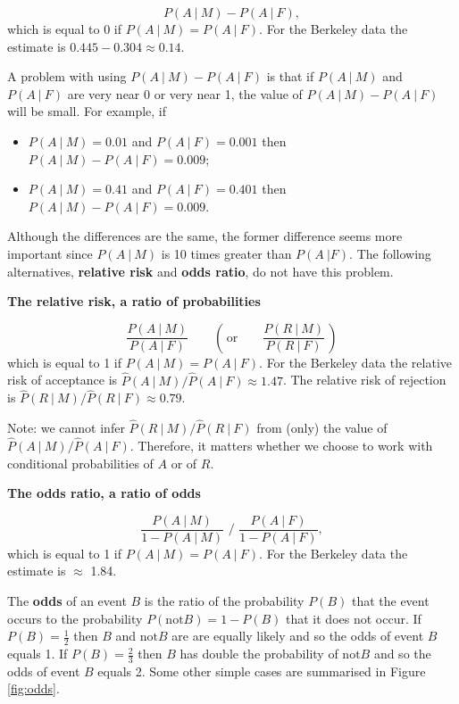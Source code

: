 \documentclass[
  british,
  11pt,
  openany, a4paper]{book}
\providecommand{\tightlist}{%
  \setlength{\itemsep}{0pt}\setlength{\parskip}{0pt}}
\begin{document}
\[P(A~|~M)-P(A~|~F),\]
which is equal to 0 if \(P(A~|~M)=P(A~|~F)\). For the Berkeley data the estimate is \(0.445 - 0.304 \approx 0.14\).

A problem with using \(P(A~|~M)-P(A~|~F)\) is that if \(P(A~|~M)\) and \(P(A~|~F)\) are very near 0 or very near 1, the value of \(P(A~|~M)-P(A~|~F)\) will be small. For example, if

\begin{itemize}
\tightlist
\item
  \(P(A~|~M)=0.01\) and \(P(A~|~F)=0.001\) then \(P(A~|~M)-P(A~|~F)=0.009\);
\item
  \(P(A~|~M)=0.41\) and \(P(A~|~F)=0.401\) then \(P(A~|~M)-P(A~|~F)=0.009\).
\end{itemize}

Although the differences are the same, the former difference seems more important since \(P(A~|~M)\) is 10 times greater than \(P(A~|F)\). The following alternatives, \textbf{relative risk} and \textbf{odds ratio}, do not have this problem.

\textbf{The relative risk, a ratio of probabilities}

\[\frac{P(A~|~M)}{P(A~|~F)} \qquad \left( \,\text{or} \qquad \frac{P(R~|~M)}{P(R~|~F)} \,\right)\]
which is equal to 1 if \(P(A~|~M)=P(A~|~F)\). For the Berkeley data the relative risk of acceptance is \(\hat{P}(A~|~M)/\hat{P}(A~|~F) \approx 1.47\). The relative risk of rejection is \(\hat{P}(R~|~M)/\hat{P}(R~|~F) \approx 0.79\).

Note: we cannot infer \(\hat{P}(R~|~M)/\hat{P}(R~|~F)\) from (only) the value of \(\hat{P}(A~|~M)/\hat{P}(A~|~F)\). Therefore, it matters whether we choose to work with conditional probabilities of \(A\) or of \(R\).

\textbf{The odds ratio, a ratio of odds}

\[\frac{P(A~|~M)}{1-P(A~|~M)}\,\,\Bigg/\,\,\frac{P(A~|~F)}{1-P(A~|~F)},\]
which is equal to 1 if \(P(A~|~M)=P(A~|~F)\). For the Berkeley data the estimate is \(\approx\) 1.84.

The \textbf{odds} of an event \(B\) is the ratio of the probability \(P(B)\) that the event occurs to the probability \(P(\text{not}B) = 1 - P(B)\) that it does not occur. If \(P(B) = \frac12\) then \(B\) and \(\text{not}B\) are are equally likely and so the odds of event \(B\) equals 1. If \(P(B) = \frac23\) then \(B\) has double the probability of \(\text{not}B\) and so the odds of event \(B\) equals 2. Some other simple cases are summarised in Figure \ref{fig:odds}.
\end{document}
